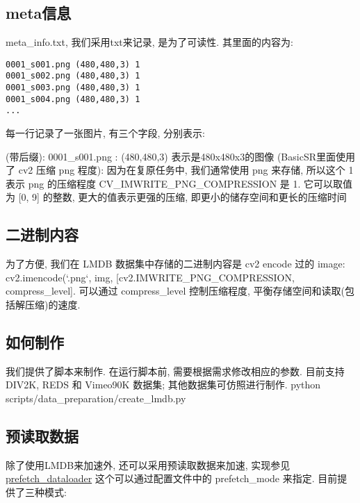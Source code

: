 \documentclass[../main.tex]{subfiles}
\begin{document}
\subsection{meta信息}

meta\_info.txt, 我们采用txt来记录, 是为了可读性. 其里面的内容为:
\begin{verbatim}
0001_s001.png (480,480,3) 1
0001_s002.png (480,480,3) 1
0001_s003.png (480,480,3) 1
0001_s004.png (480,480,3) 1
...
\end{verbatim}

每一行记录了一张图片, 有三个字段, 分别表示:
\begin{enumerate}
 (带后缀): 0001\_s001.png
: (480,480,3) 表示是480x480x3的图像
 (BasicSR里面使用了 cv2 压缩 png 程度): 因为在复原任务中, 我们通常使用 png 来存储, 所以这个 1 表示 png 的压缩程度
CV\_IMWRITE\_PNG\_COMPRESSION 是 1. 它可以取值为 [0, 9] 的整数, 更大的值表示更强的压缩, 即更小的储存空间和更长的压缩时间
\end{enumerate}

\subsection{二进制内容}

为了方便, 我们在 LMDB 数据集中存储的二进制内容是 cv2 encode 过的 image: cv2.imencode(`.png`, img, [cv2.IMWRITE\_PNG\_COMPRESSION, compress\_level]. 可以通过 compress\_level 控制压缩程度, 平衡存储空间和读取(包括解压缩)的速度.

\subsection{如何制作}

我们提供了脚本来制作. 在运行脚本前, 需要根据需求修改相应的参数. 目前支持 DIV2K, REDS 和 Vimeo90K 数据集; 其他数据集可仿照进行制作.
python scripts/data\_preparation/create\_lmdb.py

\subsection{预读取数据}

除了使用LMDB来加速外, 还可以采用预读取数据来加速, 实现参见\href{https://github.com/XPixelGroup/BasicSR/blob/master/basicsr/data/prefetch_dataloader.py}{prefetch\_dataloader}
这个可以通过配置文件中的 prefetch\_mode 来指定. 目前提供了三种模式:
\end{document}
